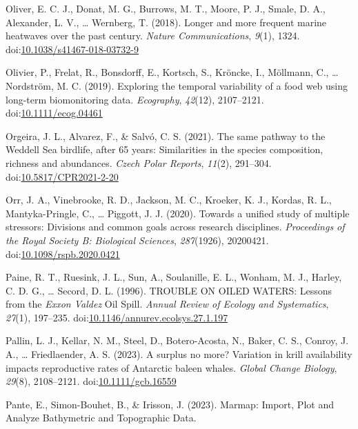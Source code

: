 \documentclass[
]{article}
\newlength{\cslhangindent}
\newenvironment{CSLReferences}[2] %
 {\begin{list}{}{%
  \setlength{\itemindent}{0pt}
  \setlength{\leftmargin}{0pt}
  \setlength{\parsep}{0pt}
  \ifodd #1
   \setlength{\leftmargin}{\cslhangindent}
   \setlength{\itemindent}{-1\cslhangindent}
  \fi
  \setlength{\itemsep}{#2\baselineskip}}}
 {\end{list}}
\begin{document}
\begin{CSLReferences}{1}{0}
Oliver, E. C. J., Donat, M. G., Burrows, M. T., Moore, P. J., Smale, D.
A., Alexander, L. V., \ldots{} Wernberg, T. (2018). Longer and more
frequent marine heatwaves over the past century. \emph{Nature
Communications}, \emph{9}(1), 1324.
doi:\href{https://doi.org/10.1038/s41467-018-03732-9}{10.1038/s41467-018-03732-9}

Olivier, P., Frelat, R., Bonsdorff, E., Kortsch, S., Kröncke, I.,
Möllmann, C., \ldots{} Nordström, M. C. (2019). Exploring the temporal
variability of a food web using long-term biomonitoring data.
\emph{Ecography}, \emph{42}(12), 2107--2121.
doi:\href{https://doi.org/10.1111/ecog.04461}{10.1111/ecog.04461}

Orgeira, J. L., Alvarez, F., \& Salvó, C. S. (2021). The same pathway to
the {Weddell Sea} birdlife, after 65 years: Similarities in the species
composition, richness and abundances. \emph{Czech Polar Reports},
\emph{11}(2), 291--304.
doi:\href{https://doi.org/10.5817/CPR2021-2-20}{10.5817/CPR2021-2-20}

Orr, J. A., Vinebrooke, R. D., Jackson, M. C., Kroeker, K. J., Kordas,
R. L., Mantyka-Pringle, C., \ldots{} Piggott, J. J. (2020). Towards a
unified study of multiple stressors: Divisions and common goals across
research disciplines. \emph{Proceedings of the Royal Society B:
Biological Sciences}, \emph{287}(1926), 20200421.
doi:\href{https://doi.org/10.1098/rspb.2020.0421}{10.1098/rspb.2020.0421}

Paine, R. T., Ruesink, J. L., Sun, A., Soulanille, E. L., Wonham, M. J.,
Harley, C. D. G., \ldots{} Secord, D. L. (1996). {TROUBLE ON OILED
WATERS}: {Lessons} from the {\emph{Exxon Valdez}} {Oil Spill}.
\emph{Annual Review of Ecology and Systematics}, \emph{27}(1), 197--235.
doi:\href{https://doi.org/10.1146/annurev.ecolsys.27.1.197}{10.1146/annurev.ecolsys.27.1.197}

Pallin, L. J., Kellar, N. M., Steel, D., Botero-Acosta, N., Baker, C.
S., Conroy, J. A., \ldots{} Friedlaender, A. S. (2023). A surplus no
more? {Variation} in krill availability impacts reproductive rates of
{Antarctic} baleen whales. \emph{Global Change Biology}, \emph{29}(8),
2108--2121.
doi:\href{https://doi.org/10.1111/gcb.16559}{10.1111/gcb.16559}

Pante, E., Simon-Bouhet, B., \& Irisson, J. (2023). Marmap: {Import},
{Plot} and {Analyze Bathymetric} and {Topographic Data}.


\end{CSLReferences}
\end{document}
